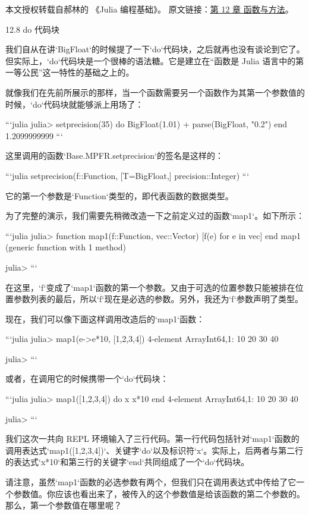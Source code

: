 
本文授权转载自郝林的 《Julia 编程基础》。 原文链接：\href{https://github.com/hyper0x/JuliaBasics/blob/master/book/ch12.md}{第 12 章 函数与方法}。


12.8 do 代码块

我们自从在讲`BigFloat`的时候提了一下`do`代码块，之后就再也没有谈论到它了。但实际上，`do`代码块是一个很棒的语法糖。它是建立在“函数是 Julia 语言中的第一等公民”这一特性的基础之上的。

就像我们在先前所展示的那样，当一个函数需要另一个函数作为其第一个参数值的时候，`do`代码块就能够派上用场了：

```julia
julia> setprecision(35) do 
           BigFloat(1.01) + parse(BigFloat, "0.2") 
       end
1.2099999999
```

这里调用的函数`Base.MPFR.setprecision`的签名是这样的：

```julia
setprecision(f::Function, [T=BigFloat,] precision::Integer)
```

它的第一个参数是`Function`类型的，即代表函数的数据类型。

为了完整的演示，我们需要先稍微改造一下之前定义过的函数`map1`。如下所示：

```julia
julia> function map1(f::Function, vec::Vector)
           [f(e) for e in vec]
       end
map1 (generic function with 1 method)

julia> 
```

在这里，`f`变成了`map1`函数的第一个参数。又由于可选的位置参数只能被排在位置参数列表的最后，所以`f`现在是必选的参数。另外，我还为`f`参数声明了类型。

现在，我们可以像下面这样调用改造后的`map1`函数：

```julia
julia> map1(e->e*10, [1,2,3,4])
4-element Array{Int64,1}:
 10
 20
 30
 40

julia> 
```

或者，在调用它的时候携带一个`do`代码块：

```julia
julia> map1([1,2,3,4]) do x
           x*10
       end
4-element Array{Int64,1}:
 10
 20
 30
 40

julia> 
```

我们这次一共向 REPL 环境输入了三行代码。第一行代码包括针对`map1`函数的调用表达式`map1([1,2,3,4])`、关键字`do`以及标识符`x`。实际上，后两者与第二行的表达式`x*10`和第三行的关键字`end`共同组成了一个`do`代码块。

请注意，虽然`map1`函数的必选参数有两个，但我们只在调用表达式中传给了它一个参数值。你应该也看出来了，被传入的这个参数值是给该函数的第二个参数的。那么，第一个参数值在哪里呢？

